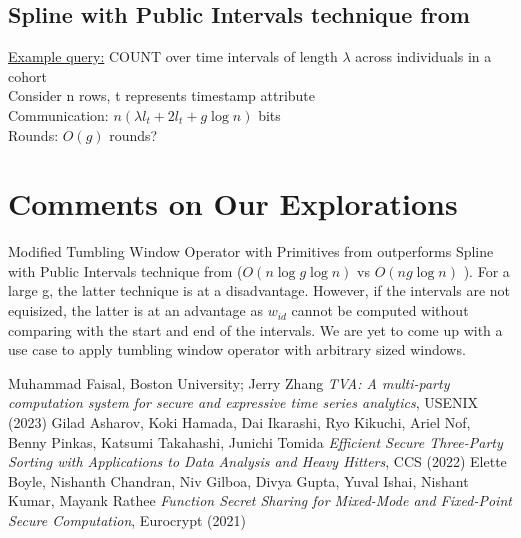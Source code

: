 \subsection{Spline with Public Intervals technique from \cite{Eu21}}
\underline{Example query:} COUNT over time intervals of length $\lambda$ across individuals in a cohort \\
Consider n rows, t represents timestamp attribute \\ 
Communication: $n(\lambda l_t + 2l_t + g \log n)$ bits \\
Rounds: $O(g)$ rounds?

\section{Comments on Our Explorations}
Modified Tumbling Window Operator with Primitives from \cite{Ha22} outperforms Spline with Public Intervals technique from \cite{Eu21} ($O(n\log g\log n)$ vs $O(ng\log n)$ ). For a large g, the latter technique is at a disadvantage. However, if the intervals are not equisized, the latter is at an advantage as $w_{id}$ cannot be computed without comparing with the start and end of the intervals. We are yet to come up with a use case to apply tumbling window operator with arbitrary sized windows.

\begin{thebibliography}{99}

 Muhammad Faisal, Boston University; Jerry Zhang \emph{TVA: A multi-party computation system for secure and expressive time series analytics}, {USENIX} (2023)
 Gilad Asharov, Koki Hamada, Dai Ikarashi, Ryo Kikuchi, Ariel Nof, Benny Pinkas, Katsumi Takahashi, Junichi Tomida \emph{Efficient Secure Three-Party Sorting with Applications to Data Analysis and Heavy Hitters}, {CCS} (2022)
 Elette Boyle, Nishanth Chandran, Niv Gilboa, Divya Gupta, Yuval Ishai, Nishant Kumar, Mayank Rathee \emph{Function Secret Sharing for Mixed-Mode and Fixed-Point Secure Computation}, {Eurocrypt} (2021)

\end{thebibliography}

%

